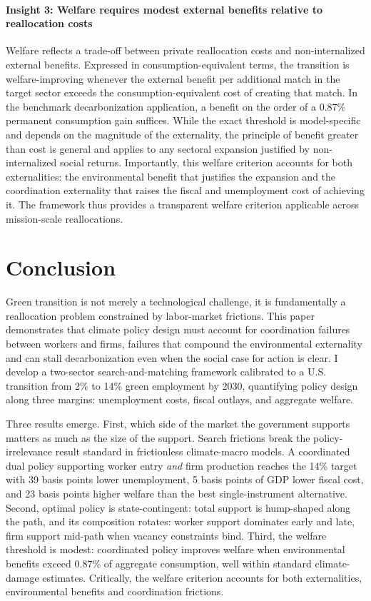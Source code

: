 \documentclass[preprint,12pt]{elsarticle}
\begin{document}
\paragraph{Insight 3: Welfare requires modest external benefits relative to reallocation costs}
Welfare reflects a trade-off between private reallocation costs and non-internalized external benefits. Expressed in consumption-equivalent terms, the transition is welfare-improving whenever the external benefit per additional match in the target sector exceeds the consumption-equivalent cost of creating that match. In the benchmark decarbonization application, a benefit on the order of a 0.87\% permanent consumption gain suffices. While the exact threshold is model-specific and depends on the magnitude of the externality, the principle of benefit greater than cost is general and applies to any sectoral expansion justified by non-internalized social returns. Importantly, this welfare criterion accounts for both externalities: the environmental benefit that justifies the expansion and the coordination externality that raises the fiscal and unemployment cost of achieving it. The framework thus provides a transparent welfare criterion applicable across mission-scale reallocations.

\section{Conclusion}

Green transition is not merely a technological challenge, it is fundamentally a reallocation problem constrained by labor-market frictions. This paper demonstrates that climate policy design must account for coordination failures between workers and firms, failures that compound the environmental externality and can stall decarbonization even when the social case for action is clear. I develop a two-sector search-and-matching framework calibrated to a U.S. transition from 2\% to 14\% green employment by 2030, quantifying policy design along three margins: unemployment costs, fiscal outlays, and aggregate welfare.

Three results emerge. First, which side of the market the government supports matters as much as the size of the support. Search frictions break the policy-irrelevance result standard in frictionless climate-macro models. A coordinated dual policy supporting worker entry \emph{and} firm production reaches the 14\% target with 39 basis points lower unemployment, 5 basis points of GDP lower fiscal cost, and 23 basis points higher welfare than the best single-instrument alternative. Second, optimal policy is state-contingent: total support is hump-shaped along the path, and its composition rotates: worker support dominates early and late, firm support mid-path when vacancy constraints bind. Third, the welfare threshold is modest: coordinated policy improves welfare when environmental benefits exceed 0.87\% of aggregate consumption, well within standard climate-damage estimates. Critically, the welfare criterion accounts for both externalities, environmental benefits and coordination frictions.
\end{document}
